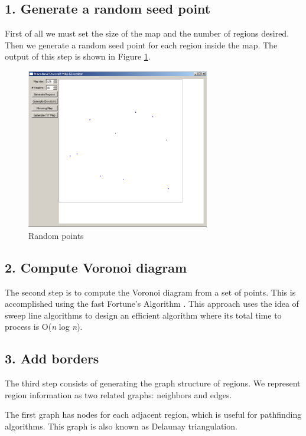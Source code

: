 \documentclass[letterpaper]{article}
\begin{document}
\subsection{1. Generate a random seed point}
First of all we must set the size of the map and the number of regions desired. Then we generate a random seed point for each region inside the map. The output of this step is shown in Figure \ref{fig:random-points}.

\begin{figure}[ht]
    \centering
    \includegraphics[width=8cm]{PCG01.png}
    \caption{Random points}
    \label{fig:random-points}
\end{figure}

\subsection{2. Compute Voronoi diagram}
The second step is to compute the Voronoi diagram from a set of points. This is accomplished using the fast Fortune's Algorithm \cite{Fortune}. This approach uses the idea of sweep line algorithms to design an efficient algorithm where its total time to process is O(\emph{n} log \emph{n}).

\subsection{3. Add borders}
The third step consists of generating the graph structure of regions. We represent region information as two related graphs: neighbors and edges.

The first graph has nodes for each adjacent region, which is useful for pathfinding algorithms. This graph is also known as Delaunay triangulation.
\end{document}
